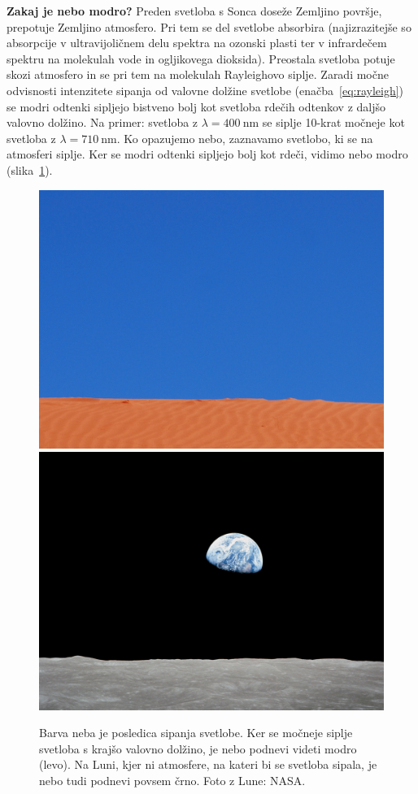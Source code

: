 \begin{example}{\bf Zakaj je nebo modro?}
Preden svetloba s Sonca doseže Zemljino površje, prepotuje Zemljino atmosfero.
Pri tem se del svetlobe absorbira (najizrazitejše so absorpcije v ultravijoličnem delu 
spektra na ozonski plasti ter v infrardečem spektru na molekulah vode in ogljikovega 
dioksida). Preostala svetloba potuje skozi atmosfero in se pri tem na molekulah
Rayleighovo siplje. Zaradi močne odvisnosti intenzitete sipanja od valovne dolžine 
svetlobe (enačba~\ref{eq:rayleigh}) se modri odtenki sipljejo 
bistveno bolj kot svetloba rdečih odtenkov z daljšo valovno dolžino.
Na primer: svetloba z $\lambda = 400~\si{\nm}$ se siplje 10-krat močneje kot 
svetloba z $\lambda = 710~\si{\nm}$. Ko opazujemo nebo, zaznavamo svetlobo, 
ki se na atmosferi siplje. Ker se modri odtenki sipljejo bolj kot rdeči, 
vidimo nebo modro (slika~\ref{fig:07_Modrina}). 
\begin{figure}[!ht]
\centering
\includegraphics[width=7truecm]{slike/07_ModroNebo.jpg}\hfill
\includegraphics[width=7truecm]{slike/07_Luna.jpg}
\caption{Barva neba je posledica sipanja svetlobe. Ker se močneje siplje 
svetloba s krajšo valovno dolžino, je nebo podnevi videti modro (levo).
Na Luni, kjer ni atmosfere, na kateri bi se svetloba sipala, je nebo 
tudi podnevi povsem črno. Foto z Lune: NASA.}
\label{fig:07_Modrina}
\end{figure}


\end{example}
